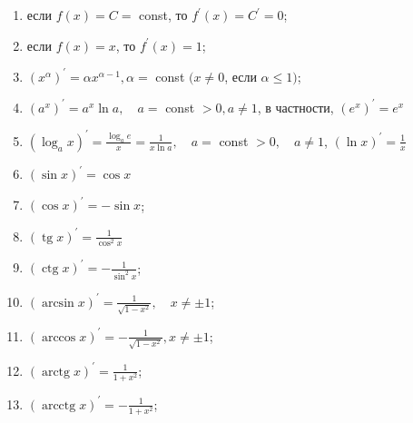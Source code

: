\documentclass[10pt]{article}
\begin{document}
\begin{enumerate}

  \item если $f(x)=C=$ const, то $f^{\prime}(x)=C^{\prime}=0$;



  \item если $f(x)=x$, то $f^{\prime}(x)=1$;



  \item $\left(x^{\alpha}\right)^{\prime}=\alpha x^{\alpha-1}, \alpha=$ const $(x \neq 0$, если $\alpha \leqslant 1)$;



  \item $\left(a^{x}\right)^{\prime}=a^{x} \ln a, \quad a=$ const $>0, a \neq 1$, в частности, $\left(e^{x}\right)^{\prime}=e^{x}$



  \item $\left(\log _{a} x\right)^{\prime}=\frac{\log _{a} e}{x}=\frac{1}{x \ln a}, \quad a=$ const $>0, \quad a \neq 1$, $(\ln x)^{\prime}=\frac{1}{x}$



  \item $(\sin x)^{\prime}=\cos x$



  \item $(\cos x)^{\prime}=-\sin x$;



  \item $(\operatorname{tg} x)^{\prime}=\frac{1}{\cos ^{2} x}$



  \item $(\operatorname{ctg} x)^{\prime}=-\frac{1}{\sin ^{2} x}$;



  \item $(\arcsin x)^{\prime}=\frac{1}{\sqrt{1-x^{2}}}, \quad x \neq \pm 1$;



  \item $(\arccos x)^{\prime}=-\frac{1}{\sqrt{1-x^{2}}}, x \neq \pm 1$;



  \item $(\operatorname{arctg} x)^{\prime}=\frac{1}{1+x^{2}}$;



  \item $(\operatorname{arcctg} x)^{\prime}=-\frac{1}{1+x^{2}}$;




\end{enumerate}
\end{document}
